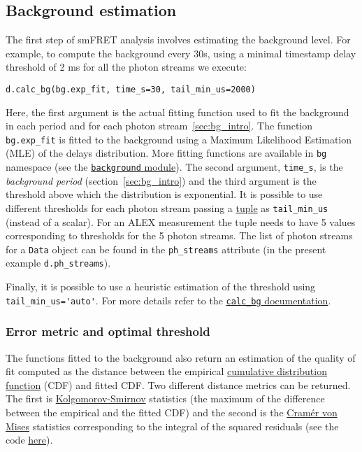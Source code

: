 \subsection{Background estimation}
\label{sec:bg_calc}

The first step of smFRET analysis involves estimating the background level. 
For example, to compute the background every 30s, using a minimal timestamp 
delay threshold of 2 ms for all the photon streams we execute: 

\begin{verbatim}
d.calc_bg(bg.exp_fit, time_s=30, tail_min_us=2000)
\end{verbatim}

Here, the first argument is the actual fitting function used to fit the
background in each period and for each photon stream~\ref{sec:bg_intro}. The function 
\verb|bg.exp_fit| is fitted to the background using a Maximum Likelihood Estimation 
(MLE) of the delays distribution. More fitting functions are available in 
\verb|bg| namespace (see the 
\href{http://fretbursts.readthedocs.org/en/latest/background.html}
{\texttt{background} module}). The second argument, \verb|time_s|, is the 
\textit{background period} (section~\ref{sec:bg_intro}) and the third argument 
is the threshold above which the distribution is exponential. 
It is possible to use different thresholds 
for each photon stream passing a 
\href{https://docs.python.org/2/tutorial/datastructures.html#tuples-and-sequences}{tuple} 
as \verb|tail_min_us| (instead of a scalar). 
For an ALEX measurement the tuple needs to have 5 values 
corresponding to thresholds for the 5 photon streams. The list of photon 
streams for a \verb|Data| object can be found in the \verb|ph_streams| 
attribute (in the present example \verb|d.ph_streams|). 

Finally, it is possible to use a heuristic estimation of the threshold using 
\verb|tail_min_us='auto'|. For more details refer to the 
\href{http://fretbursts.readthedocs.org/en/latest/data\_class.html#fretbursts.burstlib.Data.calc\_bg}{\texttt{calc\_bg} documentation}.

\subsubsection{Error metric and optimal threshold}

The functions fitted to the background also return an estimation of the 
quality of fit computed as the distance between the empirical 
\href{http://en.wikipedia.org/wiki/Cumulative\_distribution\_function}{cumulative distribution function} 
(CDF) and fitted CDF. Two different distance metrics can be returned. 
The first is  
\href{http://en.wikipedia.org/wiki/Kolmogorov\%E2\%80\%93Smirnov\_test}{Kolgomorov-Smirnov} 
statistics (the maximum of the difference between the empirical and the 
fitted CDF) and the second is the 
\href{http://en.wikipedia.org/wiki/Cram\%C3\%A9r\%E2\%80\%93von\_Mises\_criterion}{Cramér von Mises}
statistics corresponding to the integral of the squared residuals 
(see the code 
\href{https://github.com/tritemio/FRETBursts/blob/master/fretbursts/background.py#L41}{here}).

